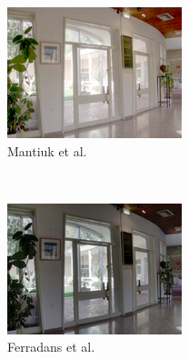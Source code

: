\begin{figure}
\begin{subfigure}[b]{0.33\textwidth}
    \includegraphics[width=\textwidth]{figures/chapter2/tmos44/44_mantiuk08.png}
    \caption{Mantiuk et al.~\cite{mantiuk2008display}}
\end{subfigure}\hfill\\
\begin{subfigure}[b]{0.33\textwidth}
    \centering
    \includegraphics[width=\textwidth]{figures/chapter2/tmos44/44_ferradans11.png}
    \caption{Ferradans et al.~\cite{ferradans2011analysis}}
\end{subfigure}\hspace{-1pt}
\begin{subfigure}[b]{0.33\textwidth}

\end{subfigure}
\end{figure}
